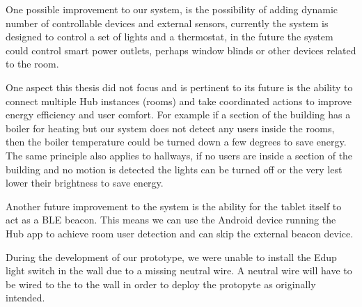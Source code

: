 One possible improvement to our system, is the possibility of adding dynamic number of controllable devices and external sensors, currently the system is designed to control a set of lights and a thermostat, in the future the system could control smart power outlets, perhaps window blinds or other devices related to the room.

One aspect this thesis did not focus and is pertinent to its future is the ability to connect multiple Hub instances (rooms) and take coordinated actions to improve energy efficiency and user comfort. For example if a section of the building has a boiler for heating but our system does not detect any users inside the rooms, then the boiler temperature could be turned down a few degrees to save energy. The same principle also applies to hallways, if no users are inside a section of the building and no motion is detected the lights can be turned off or the very lest lower their brightness to save energy.

Another future improvement to the system is the ability for the tablet itself to act as a \ac{BLE} beacon. This means we can use the Android device running the Hub app to achieve room user detection and can skip the external beacon device.

During the development of our prototype, we were unable to install the Edup light switch in the wall due to a missing neutral wire. A neutral wire will have to be wired to the to the wall in order to deploy the protopyte as originally intended. 




\cleardoublepage
